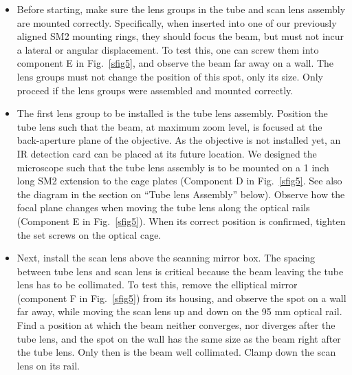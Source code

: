 \documentclass[10pt,letterpaper]{article}
\begin{document}
\begin{itemize}
    \item Before starting, make sure the lens groups in the tube and scan lens assembly are mounted correctly. Specifically, when inserted into one of our previously aligned SM2 mounting rings, they should focus the beam, but must not incur a lateral or angular displacement. To test this, one can screw them into component E in Fig.~\ref{sfig5}, and observe the beam far away on a wall. The lens groups must not change the position of this spot, only its size. Only proceed if the lens groups were assembled and mounted correctly.
    \item The first lens group to be installed is the tube lens assembly. Position the tube lens such that the beam, at maximum zoom level, is focused at the back-aperture plane of the objective. As the objective is not installed yet, an IR detection card can be placed at its future location. We designed the microscope such that the tube lens assembly is to be mounted on a 1 inch long SM2 extension to the cage plates (Component D in Fig.~\ref{sfig5}. See also the diagram in the section on ``Tube lens Assembly'' below). Observe how the focal plane changes when moving the tube lens along the optical rails (Component E in Fig.~\ref{sfig5}). When its correct position is confirmed, tighten the set screws on the optical cage.
    \item Next, install the scan lens above the scanning mirror box. The spacing between tube lens and scan lens is critical because the beam leaving the tube lens has to be collimated. To test this, remove the elliptical mirror (component F in Fig.~\ref{sfig5}) from its housing, and observe the spot on a wall far away, while moving the scan lens up and down on the 95 mm optical rail. Find a position at which the beam neither converges, nor diverges after the tube lens, and the spot on the wall has the same size as the beam right after the tube lens. Only then is the beam well collimated. Clamp down the scan lens on its rail.

\end{itemize}
\end{document}
